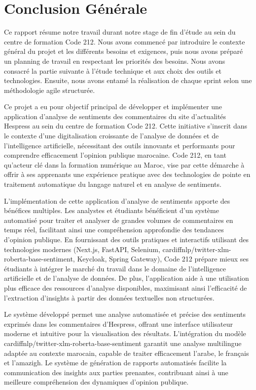 \chapter*{Conclusion Générale}

Ce rapport résume notre travail durant notre stage de fin d'étude au sein du centre de formation Code 212. Nous avons commencé par introduire le contexte général du projet et les différents besoins et exigences, puis nous avons préparé un planning de travail en respectant les priorités des besoins. Nous avons consacré la partie suivante à l'étude technique et aux choix des outils et technologies. Ensuite, nous avons entamé la réalisation de chaque sprint selon une méthodologie agile structurée.

Ce projet a eu pour objectif principal de développer et implémenter une application d'analyse de sentiments des commentaires du site d'actualités Hespress au sein du centre de formation Code 212. Cette initiative s'inscrit dans le contexte d'une digitalisation croissante de l'analyse de données et de l'intelligence artificielle, nécessitant des outils innovants et performants pour comprendre efficacement l'opinion publique marocaine. Code 212, en tant qu'acteur clé dans la formation numérique au Maroc, vise par cette démarche à offrir à ses apprenants une expérience pratique avec des technologies de pointe en traitement automatique du langage naturel et en analyse de sentiments.

L'implémentation de cette application d'analyse de sentiments apporte des bénéfices multiples. Les analystes et étudiants bénéficient d'un système automatisé pour traiter et analyser de grandes volumes de commentaires en temps réel, facilitant ainsi une compréhension approfondie des tendances d'opinion publique. En fournissant des outils pratiques et interactifs utilisant des technologies modernes (Next.js, FastAPI, Selenium, cardiffnlp/twitter-xlm-roberta-base-sentiment, Keycloak, Spring Gateway), Code 212 prépare mieux ses étudiants à intégrer le marché du travail dans le domaine de l'intelligence artificielle et de l'analyse de données. De plus, l'application aide à une utilisation plus efficace des ressources d'analyse disponibles, maximisant ainsi l'efficacité de l'extraction d'insights à partir des données textuelles non structurées.

Le système développé permet une analyse automatisée et précise des sentiments exprimés dans les commentaires d'Hespress, offrant une interface utilisateur moderne et intuitive pour la visualisation des résultats. L'intégration du modèle cardiffnlp/twitter-xlm-roberta-base-sentiment garantit une analyse multilingue adaptée au contexte marocain, capable de traiter efficacement l'arabe, le français et l'amazigh. Le système de génération de rapports automatisés facilite la communication des insights aux parties prenantes, contribuant ainsi à une meilleure compréhension des dynamiques d'opinion publique.

